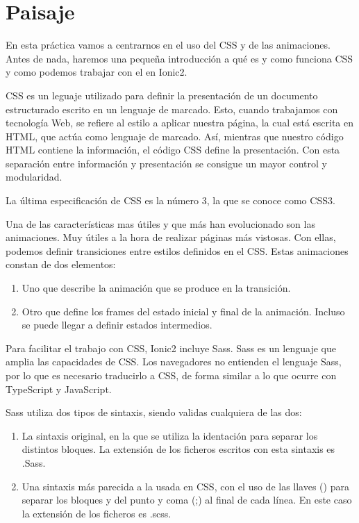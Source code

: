 \clearpage
\section{Paisaje} \label{sec:paisaje}

En esta práctica vamos a centrarnos en el uso del \gls{CSS} y de las animaciones. Antes de nada, haremos una pequeña introducción a qué es y como funciona \gls{CSS} y como podemos trabajar con el en Ionic2.

\gls{CSS} es un leguaje utilizado para definir la presentación de un documento estructurado escrito en un lenguaje de marcado. Esto, cuando trabajamos con tecnología Web, se refiere al estilo a aplicar nuestra página, la cual está escrita en \gls{HTML}, que actúa como lenguaje de marcado. Así, mientras que nuestro código \gls{HTML} contiene la información, el código \gls{CSS} define la presentación. Con esta separación entre información y presentación se consigue un mayor control y modularidad.

La última especificación de \gls{CSS} es la número 3, la que se conoce como \gls{CSS3}.

Una de las características mas útiles y que más han evolucionado son las animaciones. Muy útiles a la hora de realizar páginas más vistosas. Con ellas, podemos definir transiciones entre estilos definidos en el \gls{CSS}. Estas animaciones constan de dos elementos:

\begin{enumerate}
  \item Uno que describe la animación que se produce en la transición.
  \item Otro que define los frames del estado inicial y final de la animación. Incluso se puede llegar a definir estados intermedios.
\end{enumerate}

Para facilitar el trabajo con \gls{CSS}, Ionic2 incluye \gls{Sass}. \gls{Sass} es un lenguaje que amplia las capacidades de \gls{CSS}. Los navegadores no entienden el lenguaje \gls{Sass}, por lo que es necesario traducirlo a \gls{CSS}, de forma similar a lo que ocurre con TypeScript y JavaScript.

\gls{Sass} utiliza dos tipos de sintaxis, siendo validas cualquiera de las dos:
\begin{enumerate}
  \item La sintaxis original, en la que se utiliza la identación para separar los distintos bloques. La extensión de los ficheros escritos con esta sintaxis es .Sass.
  \item Una sintaxis más parecida a la usada en \gls{CSS}, con el uso de las llaves ({}) para separar los bloques y del punto y coma (;) al final de cada línea. En este caso la extensión de los ficheros es .scss.
\end{enumerate}

